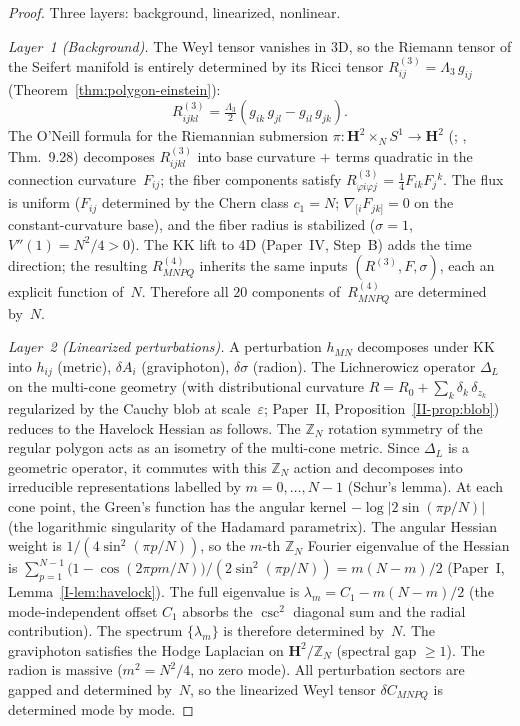 \begin{proof}
Three layers: background, linearized, nonlinear.

\emph{Layer~1 (Background).}
The Weyl tensor vanishes in $3$D, so the Riemann tensor
of the Seifert manifold is entirely determined by its
Ricci tensor $R^{(3)}_{ij} = \Lambda_3\,g_{ij}$
(Theorem~\ref{thm:polygon-einstein}):
\begin{equation}\label{eq:riemann-3d-explicit}
  R^{(3)}_{ijkl}
  = \tfrac{\Lambda_3}{2}
    (g_{ik}\,g_{jl} - g_{il}\,g_{jk}).
\end{equation}
The O'Neill formula for the Riemannian submersion
$\pi\colon \mathbf{H}^2 \times_N S^1 \to \mathbf{H}^2$
(\citealt{ONeill1966}; \citealt{Besse1987}, Thm.~9.28)
decomposes $R^{(3)}_{ijkl}$ into base curvature $+$
terms quadratic in the connection curvature~$F_{ij}$;
the fiber components satisfy
$R^{(3)}_{\varphi i\varphi j}
= \tfrac{1}{4}F_{ik}F_j{}^k$.
The flux is uniform ($F_{ij}$ determined by the Chern
class $c_1 = N$; $\nabla_{[i}F_{jk]} = 0$ on the
constant-curvature base), and the fiber radius is
stabilized ($\sigma = 1$, $V''(1) = N^2/4 > 0$).
The KK lift to $4$D (Paper~IV, Step~B) adds the
time direction; the resulting $R^{(4)}_{MNPQ}$ inherits
the same inputs $(R^{(3)}, F, \sigma)$, each an explicit
function of~$N$. Therefore all $20$ components
of~$R^{(4)}_{MNPQ}$ are determined by~$N$.

\emph{Layer~2 (Linearized perturbations).}
A perturbation $h_{MN}$ decomposes under KK
into $h_{ij}$ (metric), $\delta A_i$ (graviphoton),
$\delta\sigma$ (radion).
The Lichnerowicz operator $\Delta_L$ on the multi-cone
geometry (with distributional curvature $R = R_0
+ \sum_k \delta_k\,\delta_{z_k}$ regularized by
the Cauchy blob at scale~$\varepsilon$; Paper~II,
Proposition~\ref*{II-prop:blob})
reduces to the Havelock Hessian as follows.
The $\mathbb{Z}_N$ rotation symmetry of the regular
polygon acts as an isometry of the multi-cone metric.
Since $\Delta_L$ is a geometric operator, it commutes
with this $\mathbb{Z}_N$ action and decomposes into
irreducible representations labelled by
$m = 0, \ldots, N{-}1$ (Schur's lemma).
At each cone point, the Green's function has the
angular kernel $-\log|2\sin(\pi p/N)|$
(the logarithmic singularity of the Hadamard parametrix).
The angular Hessian weight is
$1/(4\sin^2(\pi p/N))$,
so the $m$-th $\mathbb{Z}_N$ Fourier eigenvalue of
the Hessian is
$\sum_{p=1}^{N-1}
\bigl(1 - \cos(2\pi pm/N)\bigr)/(2\sin^2(\pi p/N)) = m(N{-}m)/2$
(Paper~I, Lemma~\ref*{I-lem:havelock}).
The full eigenvalue is $\lambda_m = C_1 - m(N{-}m)/2$
(the mode-independent offset $C_1$ absorbs the
$\csc^2$ diagonal sum and the radial contribution).
The spectrum $\{\lambda_m\}$ is therefore determined by~$N$.
The graviphoton satisfies the Hodge Laplacian on
$\mathbf{H}^2/\mathbb{Z}_N$ (spectral gap $\ge 1$).
The radion is massive ($m^2 = N^2/4$, no zero mode).
All perturbation sectors are gapped and determined by~$N$,
so the linearized Weyl tensor $\delta C_{MNPQ}$ is
determined mode by mode.


\end{proof}

